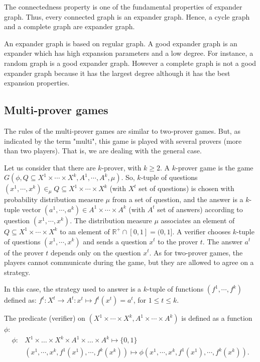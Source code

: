 The connectedness  property is one of the fundamental properties of expander graph. Thus, every connected graph is an expander graph. Hence, a cycle graph and a complete graph are expander graph.

An expander graph is based on regular graph. A good expander graph is an expander which has high expansion parameters and a low degree.  For instance, a random graph is a good expander graph. However a complete graph is not a good expander graph because it has the largest degree although it has the best expansion properties.


 \subsection{Multi-prover games} The rules of the multi-prover games are similar to two-prover games. But, as indicated by the term "multi", this game is played
 with several provers (more than two players). That is, we are dealing with the general case.

Let us consider that there are $k$-prover, with $k \geq 2$. A $k$-prover  game is the game $G(\phi, Q \subseteq X^1  \times \cdots \times X^k , A^1 , \cdots,  A^k, \mu) $. So, $k$-tuple of questions $(x^1, \cdots , x^k) \in_{\mu} Q \subseteq X^1  \times \cdots \times X^k $ (with $X^t$ set of questions)
is chosen with probability distribution measure $\mu $ from a set of question,
and the answer is a $k$-tuple vector $(a^1, \cdots , a^k)  \in A^1 \times \cdots \times A^k$ (with $A^t$ set of answers) according to question $(x^1, \cdots , x^k).$ The distribution measure $\mu $ associates an element of $ Q \subseteq  X^1  \times \cdots \times X^k $ to an element of $\mathbb{R}^+ \cap [0,1]= (0, 1].$
A verifier chooses $k$-tuple of questions $(x^1, \cdots , x^k)$ and sends a question $x^t$ to the prover $t$. The answer $a^t$ of the prover $t$ depends only on the question $x^t.$ As for two-prover games, the players cannot communicate during the game, but they are allowed to agree on a strategy. 

In this case, the strategy used to answer is a $k$-tuple of functions $(f^1, \cdots , f^k)$ defined as:
$f^t: X^t \longrightarrow A^t: x^t \longmapsto f^t(x^t)=a^t$, for $1\leq t \leq k.$

The predicate (verifier) on $( X^1 \times \cdots \times X^k, A^1 \times \cdots \times A^k)$ is defined as a function $\phi$:
\begin{align*}
\phi : & X^1 \times \ldots \times X^k \times A^1 \times \ldots \times A^k \longmapsto \{0,1\} \\
& (x^1, \cdots , x^k, f^1(x^1), \cdots , f^k(x^k)) \longmapsto \phi (x^1, \cdots , x^k, f^1(x^1), \cdots , f^k(x^k)).
\end{align*}

